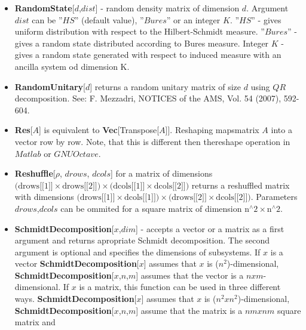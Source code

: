 \documentclass[a4paper,10pt]{scrartcl}
\begin{document}
\begin{itemize}
\item  \textbf{RandomState}[$d$,$dist$] - random density matrix of dimension $d$. Argument $dist$ can be ''$HS$'' (default value), ''$Bures$'' or an integer $K$. \newline{}
\indent{} ''$HS$'' - gives uniform distribution with respect to the Hilbert-Schmidt measure. \newline{}
\indent{} ''$Bures$'' - gives a random state distributed according to Bures measure. \newline{}
\indent{} Integer $K$ - gives a random state generated with respect to induced measure with an ancilla system od dimension K.
\item  \textbf{RandomUnitary}[$d$] returns a random unitary matrix of size $d$ using $QR$ decomposition. See: F. Mezzadri,  NOTICES of the AMS, Vol. 54 (2007), 592-604.
\item  \textbf{Res}[$A$] is equivalent to \textbf{Vec}[Transpose[$A$]]. Reshaping mapsmatrix $A$ into a vector row by row. Note, that this is different then thereshape operation in $Matlab$ or $GNU Octave$.
\item  \textbf{Reshuffle}[$\rho$, {$drows$, $dcols$}] for a matrix of dimensions $\text{(drows[[1]]$\times $drows[[2]])$\times $(dcols[[1]]$\times $dcols[[2]])}$ returns a reshuffled matrix with dimensions $\text{(drows[[1]]$\times $dcols[[1]])$\times $(drows[[2]]$\times $dcols[[2]])}$.\newline{}
Parameters {$drows$,$dcols$} can be ommited for a square matrix of dimension $\text{n${}^{\wedge}$2$\times $n${}^{\wedge}$2}$.
\item  \textbf{SchmidtDecomposition}[$x$,$dim$] - accepts a vector or a matrix as a first argument and returns apropriate Schmidt decomposition. The second argument is optional and specifies the dimensions of subsystems.\newline{}
If $x$ is a vector\newline{}
\indent{} \textbf{SchmidtDecomposition}[$x$] assumes that $x$ is ($n^2$)-dimensional,\newline{}
\indent{} \textbf{SchmidtDecomposition}[$x$,{$n$,$m$}] assumes that the vector is a $n xm$-dimensional.\newline{}
If $x$ is a matrix, this function can be used in three different ways.\newline{}
\indent{} \textbf{SchmidtDecomposition}[$x$] assumes that $x$ is ($n^2xn^2$)-dimensional, \newline{}
\indent{} \textbf{SchmidtDecomposition}[$x$,{$n$,$m$}] assume that the matrix is a $n mxn m$ square matrix and\newline{}

\end{itemize}
\end{document}
